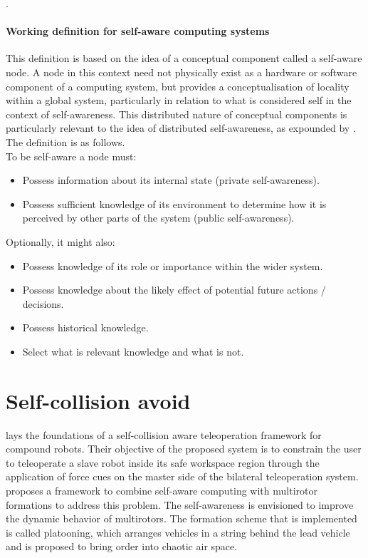 \documentclass{article}
\begin{document}
		
		\citet{mitchell-2005-self-awareness-and-control-in-decentralized-systems}.
		
		\paragraph{Working definition for self-aware computing systems}
		This definition is based on the idea of a conceptual component called a self-aware node. A node in this context need not physically exist as a hardware or software component of a computing system, but provides a conceptualisation of locality within a global system, particularly in relation to what is considered self in the context of self-awareness. This distributed nature of conceptual components is particularly relevant to the idea of distributed self-awareness, as expounded by \citet{mitchell-2005-self-awareness-and-control-in-decentralized-systems}. The definition is as follows.
		\\
		To be self-aware a node must:
		\begin{itemize}
			\item Possess information about its internal state
			(private self-awareness).
			\item Possess sufficient knowledge of its environment to determine how it is perceived by other
			parts of the system (public self-awareness).
		\end{itemize}
		Optionally, it might also:
		\begin{itemize}
			\item Possess knowledge of its role or importance
			within the wider system.
			\item Possess knowledge about the likely effect of
			potential future actions / decisions.
			\item Possess historical knowledge.
			\item Select what is relevant knowledge and what is
			not.
		\end{itemize}
	\section{Self-collision avoid}
	\cite{selvaggio-2017-towards-a-self-collision-aware-teleoperation-framework-for-compound-robots} lays the foundations of a self-collision aware teleoperation framework for compound robots. Their objective of the proposed system is to constrain the user to teleoperate a slave robot inside its safe workspace region through the application of force cues on the master side of the bilateral teleoperation system.
	\cite{kaiser-2020-towards-self-aware-multirotor-formations} proposes a framework to combine self-aware computing with multirotor formations to address this problem. The self-awareness is envisioned to improve the
	dynamic behavior of multirotors. The formation scheme that is implemented is called platooning,
	which arranges vehicles in a string behind the lead vehicle and is proposed to bring order into chaotic
	air space.
\end{document}
